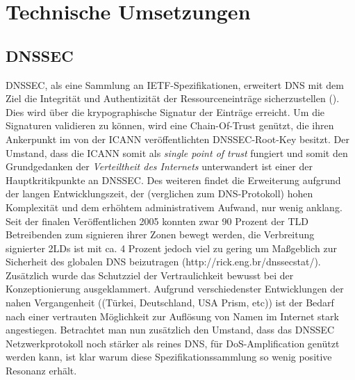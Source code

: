 \chapter{Technische Umsetzungen}
\label{chap:technologies}

\section{DNSSEC}

DNSSEC, als eine Sammlung an IETF-Spezifikationen, erweitert DNS mit dem Ziel die Integrität und Authentizität der Ressourceneinträge sicherzustellen (\cite{Arends2005}). Dies wird über die krypographische Signatur der Einträge erreicht. Um die Signaturen validieren zu können, wird eine Chain-Of-Trust genützt, die ihren Ankerpunkt im von der ICANN veröffentlichten DNSSEC-Root-Key besitzt. Der Umstand, dass die ICANN somit als \textit{single point of trust} fungiert und somit den Grundgedanken der \textit{Verteiltheit des Internets} unterwandert ist einer der Hauptkritikpunkte an DNSSEC. Des weiteren findet die Erweiterung aufgrund der langen Entwicklungszeit, der (verglichen zum DNS-Protokoll) hohen Komplexität und dem erhöhtem administrativem Aufwand, nur wenig anklang. Seit der finalen Veröffentlichen 2005 konnten zwar 90 Prozent der TLD Betreibenden zum signieren ihrer Zonen bewegt werden, die Verbreitung signierter 2LDs ist mit ca. 4 Prozent jedoch viel zu gering um Maßgeblich zur Sicherheit des globalen DNS beizutragen (http://rick.eng.br/dnssecstat/). Zusätzlich wurde das Schutzziel der Vertraulichkeit bewusst bei der Konzeptionierung ausgeklammert. Aufgrund verschiedenster Entwicklungen der nahen Vergangenheit ((Türkei, Deutschland, USA Prism, etc)) ist der Bedarf nach einer vertrauten Möglichkeit zur Auflösung von Namen im Internet stark angestiegen. Betrachtet man nun zusätzlich den Umstand, dass das DNSSEC Netzwerkprotokoll noch stärker als reines DNS, für DoS-Amplification genützt werden kann, ist klar warum diese Spezifikationssammlung so wenig positive Resonanz erhält.



